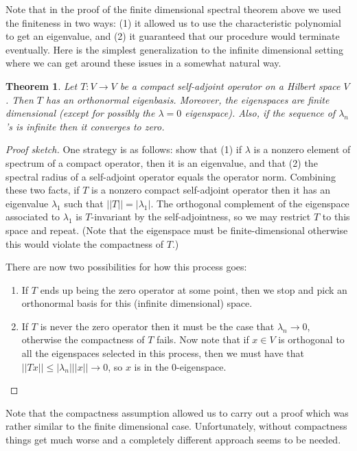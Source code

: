 \documentclass[a4paper,11pt,twoside]{amsart}
\newtheorem*{theorem}{Theorem}
\theoremstyle{definition}
\begin{document}
Note that in the proof of the finite dimensional spectral theorem above we used the finiteness in two ways: (1) it allowed us to use the characteristic polynomial to get an eigenvalue, and (2) it guaranteed that our procedure would terminate eventually. Here is the simplest generalization to the infinite dimensional setting where we can get around these issues in a somewhat natural way.
\begin{theorem}
Let $T \colon V \to V$ be a compact self-adjoint operator on a Hilbert space $V$. Then $T$ has an orthonormal eigenbasis. Moreover, the eigenspaces are finite dimensional (except for possibly the $\lambda=0$ eigenspace). Also, if the sequence of $\lambda_n$'s is infinite then it converges to zero.
\end{theorem}


\begin{proof}[Proof sketch]
One strategy is as follows: show that (1) if $\lambda$ is a nonzero element of spectrum of a compact operator, then it is an eigenvalue, and that (2) the spectral radius of a self-adjoint operator equals the operator norm. Combining these two facts, if $T$ is a nonzero compact self-adjoint operator then it has an eigenvalue $\lambda_1$ such that $||T||=|\lambda_1|.$ The orthogonal complement of the eigenspace associated to $\lambda_1$ is $T$-invariant by the self-adjointness, so we may restrict $T$ to this space and repeat. (Note that the eigenspace must be finite-dimensional otherwise this would violate the compactness of $T$.)

There are now two possibilities for how this process goes:
\begin{enumerate}
    \item If $T$ ends up being the zero operator at some point, then we stop and pick an orthonormal basis for this (infinite dimensional) space.
    \item If $T$ is never the zero operator then it must be the case that $\lambda_n \to 0$, otherwise the compactness of $T$ fails. Now note that if $x \in V$ is orthogonal to all the eigenspaces selected in this process, then we must have that $||Tx||\leq |\lambda_n| ||x|| \to 0$, so $x$ is in the 0-eigenspace.
\end{enumerate}

\end{proof}

Note that the compactness assumption allowed us to carry out a proof which was rather similar to the finite dimensional case. Unfortunately, without compactness things get much worse and a completely different approach seems to be needed.
\end{document}
